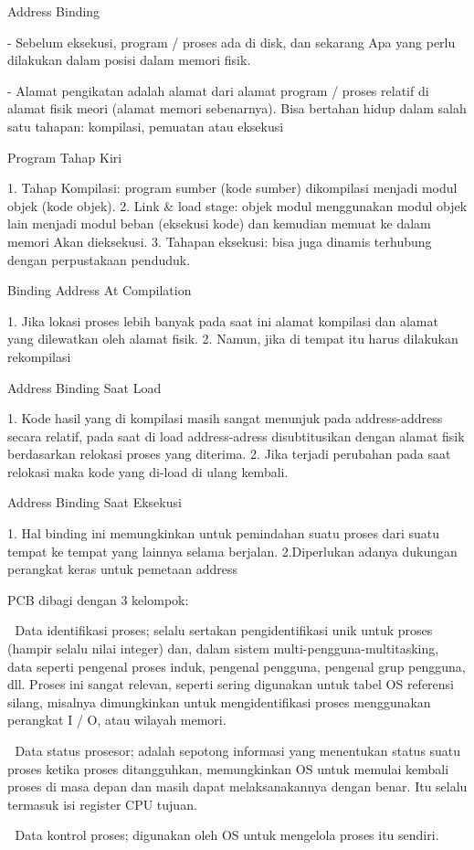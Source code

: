 Address Binding

- Sebelum eksekusi, program / proses ada di disk, dan sekarang
Apa yang perlu dilakukan dalam posisi dalam memori fisik.

- Alamat pengikatan adalah alamat dari alamat program / proses relatif
di alamat fisik meori (alamat memori sebenarnya). Bisa bertahan hidup
dalam salah satu tahapan: kompilasi, pemuatan atau eksekusi

Program Tahap Kiri

1. Tahap Kompilasi: program sumber (kode sumber) dikompilasi menjadi
modul objek (kode objek).
2. Link & load stage: objek modul menggunakan modul objek lain
menjadi modul beban (eksekusi kode) dan kemudian memuat ke dalam memori
Akan dieksekusi.
3. Tahapan eksekusi: bisa juga dinamis
terhubung dengan perpustakaan penduduk.

Binding Address At Compilation

1. Jika lokasi proses lebih banyak pada saat ini
alamat kompilasi dan alamat yang dilewatkan oleh alamat
fisik.
2. Namun, jika di tempat itu harus dilakukan rekompilasi

Address Binding Saat Load

1. Kode hasil yang di kompilasi masih sangat menunjuk pada address-address secara relatif, pada saat di load address-adress disubtitusikan dengan alamat fisik berdasarkan relokasi proses yang diterima.
2. Jika terjadi perubahan pada saat relokasi maka kode yang di-load di ulang kembali.

Address Binding Saat Eksekusi

1. Hal binding ini memungkinkan untuk pemindahan suatu proses dari suatu tempat ke tempat yang lainnya selama berjalan.
2.Diperlukan adanya dukungan perangkat keras untuk pemetaan address

PCB dibagi dengan 3 kelompok:

 Data identifikasi proses; selalu sertakan pengidentifikasi unik untuk proses (hampir selalu nilai integer) dan, dalam sistem multi-pengguna-multitasking, data seperti pengenal proses induk, pengenal pengguna, pengenal grup pengguna, dll. Proses ini sangat relevan, seperti sering digunakan untuk tabel OS referensi silang, misalnya dimungkinkan untuk mengidentifikasi proses menggunakan perangkat I / O, atau wilayah memori.

 Data status prosesor; adalah sepotong informasi yang menentukan status suatu proses ketika proses ditangguhkan, memungkinkan OS untuk memulai kembali proses di masa depan dan masih dapat melaksanakannya dengan benar. Itu selalu termasuk isi register CPU tujuan.

 Data kontrol proses; digunakan oleh OS untuk mengelola proses itu sendiri.

